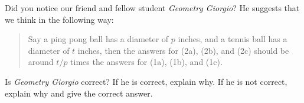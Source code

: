 \documentclass[handout,noauthor,nooutcomes,hints]{ximera}
\begin{document}
\mynewpage

\begin{question}
Did you notice our friend and fellow student \textit{Geometry Giorgio}? He
suggests that we think in the following way:
\begin{quote}
  Say a ping pong ball has a diameter of $p$ inches, and a
tennis ball has a diameter of $t$ inches, then the answers for
(2a), (2b), and (2c) should be around $t/p$ times the answers for
(1a), (1b), and (1c).
\end{quote}
Is \textit{Geometry Giorgio} correct?  If he is
correct, explain why. If he is not correct, explain why and give the
correct answer.
\end{question}
\end{document}
